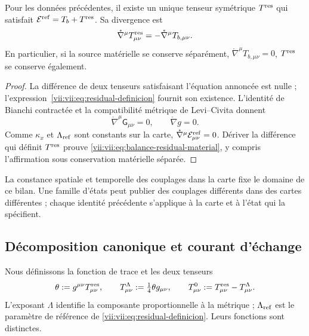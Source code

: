 \begin{theorem}
\label{vii:vii:thm:residual-unicidad-balance}
Pour les données précédentes, il existe un unique tenseur symétrique \(T^{\rm res}\) qui satisfait \(\mathcal E^{\rm ref}=T_b+T^{\rm res}\). Sa divergence est
\begin{equation}
 \mathring\nabla^\mu T^{\rm res}_{\mu\nu}
 =-\mathring\nabla^\mu T_{b,\mu\nu}.
 \label{vii:vii:eq:balance-residual-material}
\end{equation}
En particulier, si la source matérielle se conserve séparément,
\(\mathring\nabla^\mu T_{b,\mu\nu}=0\), \(T^{\rm res}\)
se conserve également.
\end{theorem}
\begin{proof}
La différence de deux tenseurs satisfaisant l'équation annoncée est nulle ; l'expression~\eqref{vii:vii:eq:residual-definicion} fournit son existence. L'identité de Bianchi contractée et la compatibilité métrique de Levi--Civita donnent
\[
 \mathring\nabla^\mu\mathsf G_{\mu\nu}=0,
 \qquad \mathring\nabla g=0.
\]
Comme \(\kappa_x\) et \(\Lambda_{\rm ref}\) sont constants sur la
carte, \(\mathring\nabla^\mu\mathcal E^{\rm ref}_{\mu\nu}=0\).
Dériver la différence qui définit \(T^{\rm res}\) prouve
\eqref{vii:vii:eq:balance-residual-material}, y compris l'affirmation sous
conservation matérielle séparée.
\end{proof}

La constance spatiale et temporelle des couplages dans la carte fixe
le domaine de ce bilan. Une famille d'états peut publier
des couplages différents dans des cartes différentes ; chaque identité précédente
s'applique à la carte et à l'état qui la spécifient.

\subsection{Décomposition canonique et courant d'échange}
\label{vii:vii:subsec:traza-corriente-residual}

Nous définissons la fonction de trace et les deux tenseurs
\begin{equation}
 \theta:=g^{\mu\nu}T^{\rm res}_{\mu\nu},\qquad
 T^{\Lambda}_{\mu\nu}:=\tfrac14\theta g_{\mu\nu},\qquad
 T^{0}_{\mu\nu}:=T^{\rm res}_{\mu\nu}-T^{\Lambda}_{\mu\nu}.
 \label{vii:vii:eq:descomposicion-traza-residual}
\end{equation}
L'exposant \(\Lambda\) identifie la composante proportionnelle à la
métrique ; \(\Lambda_{\rm ref}\) est le paramètre de référence de
\eqref{vii:vii:eq:residual-definicion}. Leurs fonctions sont distinctes.

